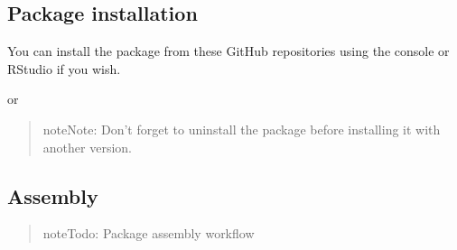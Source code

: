 \documentclass[a4paper,12pt,english]{sphinxhowto}
\begin{document}


\subsection{Package installation}
\label{\detokenize{sdam:package-installation}}\label{\detokenize{sdam:sdam-inst}}
You can install the  package from these GitHub repositories using  the  console
or RStudio if you wish.

\begin{sphinxVerbatim}[commandchars=\\\{\},formatcom=\footnotesize]
  
\end{sphinxVerbatim}

or

\begin{sphinxVerbatim}[commandchars=\\\{\},formatcom=\footnotesize]
 
\end{sphinxVerbatim}

\begin{quote}

\begin{sphinxadmonition}{note}{Note:}
Don’t forget to uninstall the package before installing it with another version.
\end{sphinxadmonition}
\end{quote}



\subsection{Assembly}
\label{\detokenize{sdam:assembly}}\begin{quote}

\begin{sphinxadmonition}{note}{\label{\detokenize{sdam:id4}}Todo:}
Package assembly workflow
\end{sphinxadmonition}
\end{quote}
\end{document}
